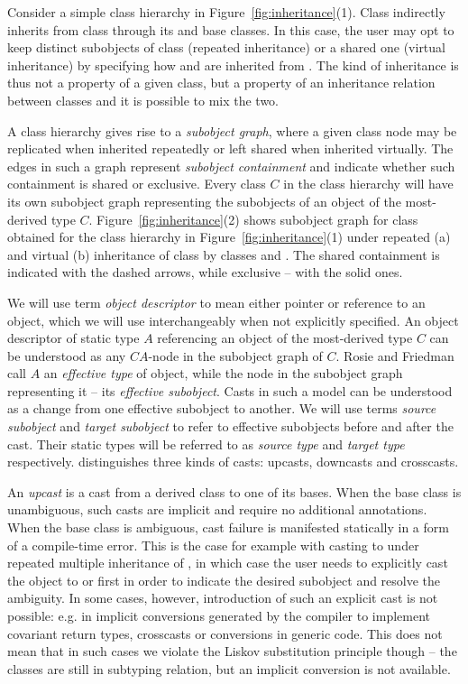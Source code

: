 \noindent
Consider a simple class hierarchy in Figure~\ref{fig:inheritance}(1). Class 
 indirectly inherits from class  through its  and 
 base classes. In this case, the user may opt to keep distinct 
subobjects of class  (repeated inheritance) or a shared one (virtual 
inheritance) by specifying how  and  are inherited from 
. The kind of inheritance is thus not a property of a given class, but a 
property of an inheritance relation between classes and it is possible to mix the two. 

A class hierarchy gives rise to a \emph{subobject graph}, where a given class 
node may be replicated when inherited repeatedly or left shared when inherited 
virtually. The edges in such a graph represent \emph{subobject containment} and 
indicate whether such containment is shared or exclusive. 
Every class $C$ in the class hierarchy will have its own subobject 
graph representing the subobjects of an object of the most-derived type $C$.
Figure~\ref{fig:inheritance}(2) shows subobject graph for class  
obtained for the class hierarchy in Figure~\ref{fig:inheritance}(1) under repeated (a) and virtual (b) 
inheritance of class  by classes  and . The shared 
containment is indicated with the dashed arrows, while exclusive -- with the solid 
ones.

We will use term \emph{object descriptor} to mean either pointer or reference to 
an object, which we will use interchangeably when not explicitly specified. 
An object descriptor of static type $A$ referencing an object of the most-derived 
type $C$ can be understood as any $C$\code{::*::}$A$-node in the subobject graph of $C$. Rosie 
and Friedman call $A$ an \emph{effective type} of object, while the node in the 
subobject graph representing it -- its \emph{effective subobject}. 
Casts in such a model can be understood as a change from one effective subobject 
to another. We will use terms \emph{source subobject} and \emph{target 
subobject} to refer to effective subobjects before and after the cast. Their 
static types will be referred to as \emph{source type} and \emph{target type} 
respectively. \Cpp{} distinguishes three kinds of casts: upcasts, downcasts and 
crosscasts.

An \emph{upcast} is a cast from a derived class to one of its bases. When the 
base class is unambiguous, such casts are implicit and require no additional 
annotations. When the base class is ambiguous, cast failure is manifested 
statically in a form of a compile-time error. This is the case for example with 
casting  to  under repeated multiple inheritance of , 
in which case the user needs to explicitly cast the object to  or 
 first in order to indicate the desired subobject and resolve the ambiguity. 
In some cases, however, introduction of such an explicit cast is not possible: 
e.g. in implicit conversions generated by the compiler to implement covariant 
return types, crosscasts or conversions in generic code. This does not mean 
that in such cases we violate the Liskov substitution principle though -- the 
classes are still in subtyping relation, but an implicit conversion is not 
available.

